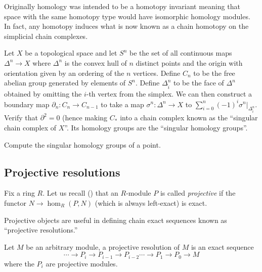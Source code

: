 Originally homology was
intended to be a homotopy invariant meaning that space with the
same homotopy type would have isomorphic homology modules. In fact, any
homotopy induces what is now known as a chain homotopy on the simplicial chain
complexes.

\begin{exercise} Let $X$ be a topological
space and let $S^n$ be the set of all continuous maps
$\Delta^n\rightarrow X$ where $\Delta^n$ is the convex hull of
$n$ distinct points and the origin with orientation given by an
ordering of the $n$ vertices. Define $C_n$ to be the free
abelian group generated by elements of $S^n$. Define
$\Delta^n_{\hat{i}}$ to be the face of $\Delta^n$ obtained by
omitting the $i$-th vertex from the simplex. We can then
construct a boundary map $\partial_n:C_n\rightarrow C_{n-1}$ to
take a map $\sigma^n:\Delta^n\rightarrow X$ to
$\sum_{i=0}^n(-1)^i\sigma^n|_{\Delta^n_{\hat{i}}}$. Verify that
$\partial^2=0$ (hence making $C_*$ into a chain complex known as
the ``singular chain complex of $X$''. Its homology groups are
the ``singular homology groups''. \end{exercise}

\begin{exercise} Compute the singular homology groups of a
point. \end{exercise}


\subsection{Projective resolutions}

Fix a ring $R$.
Let us recall () that an $R$-module $P$ is called
\emph{projective} if the functor $N \to \hom_R(P,N)$ (which is always
left-exact) is exact.

Projective objects are useful in defining chain exact sequences
known as ``projective resolutions.''

\begin{definition} Let $M$ be an arbitrary module, a projective
resolution of
$M$ is an exact sequence
\begin{equation} \cdots\rightarrow P_i\rightarrow
P_{i-1}\rightarrow
P_{i-2}\cdots\rightarrow P_1\rightarrow P_0\rightarrow M
\end{equation} where
the $P_i$ are projective modules. \end{definition}


